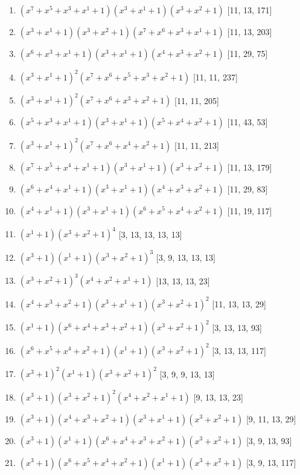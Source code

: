 \documentclass[10pt,twocolumn]{article}
\begin{document}
\begin{enumerate}
\item $(x^{7} + x^{5} + x^{3} + x^{1} + 1)(x^{3} + x^{1} + 1)(x^{3} + x^{2} + 1)$  [11, 13, 171]
\item $(x^{3} + x^{1} + 1)(x^{3} + x^{2} + 1)(x^{7} + x^{6} + x^{3} + x^{1} + 1)$  [11, 13, 203]
\item $(x^{6} + x^{3} + x^{1} + 1)(x^{3} + x^{1} + 1)(x^{4} + x^{3} + x^{2} + 1)$  [11, 29, 75]
\item $(x^{3} + x^{1} + 1)^{2}(x^{7} + x^{6} + x^{5} + x^{3} + x^{2} + 1)$  [11, 11, 237]
\item $(x^{3} + x^{1} + 1)^{2}(x^{7} + x^{6} + x^{3} + x^{2} + 1)$  [11, 11, 205]
\item $(x^{5} + x^{3} + x^{1} + 1)(x^{3} + x^{1} + 1)(x^{5} + x^{4} + x^{2} + 1)$  [11, 43, 53]
\item $(x^{3} + x^{1} + 1)^{2}(x^{7} + x^{6} + x^{4} + x^{2} + 1)$  [11, 11, 213]
\item $(x^{7} + x^{5} + x^{4} + x^{1} + 1)(x^{3} + x^{1} + 1)(x^{3} + x^{2} + 1)$  [11, 13, 179]
\item $(x^{6} + x^{4} + x^{1} + 1)(x^{3} + x^{1} + 1)(x^{4} + x^{3} + x^{2} + 1)$  [11, 29, 83]
\item $(x^{4} + x^{1} + 1)(x^{3} + x^{1} + 1)(x^{6} + x^{5} + x^{4} + x^{2} + 1)$  [11, 19, 117]
\item $(x^{1} + 1)(x^{3} + x^{2} + 1)^{4}$  [3, 13, 13, 13, 13]
\item $(x^{3} + 1)(x^{1} + 1)(x^{3} + x^{2} + 1)^{3}$  [3, 9, 13, 13, 13]
\item $(x^{3} + x^{2} + 1)^{3}(x^{4} + x^{2} + x^{1} + 1)$  [13, 13, 13, 23]
\item $(x^{4} + x^{3} + x^{2} + 1)(x^{3} + x^{1} + 1)(x^{3} + x^{2} + 1)^{2}$  [11, 13, 13, 29]
\item $(x^{1} + 1)(x^{6} + x^{4} + x^{3} + x^{2} + 1)(x^{3} + x^{2} + 1)^{2}$  [3, 13, 13, 93]
\item $(x^{6} + x^{5} + x^{4} + x^{2} + 1)(x^{1} + 1)(x^{3} + x^{2} + 1)^{2}$  [3, 13, 13, 117]
\item $(x^{3} + 1)^{2}(x^{1} + 1)(x^{3} + x^{2} + 1)^{2}$  [3, 9, 9, 13, 13]
\item $(x^{3} + 1)(x^{3} + x^{2} + 1)^{2}(x^{4} + x^{2} + x^{1} + 1)$  [9, 13, 13, 23]
\item $(x^{3} + 1)(x^{4} + x^{3} + x^{2} + 1)(x^{3} + x^{1} + 1)(x^{3} + x^{2} + 1)$  [9, 11, 13, 29]
\item $(x^{3} + 1)(x^{1} + 1)(x^{6} + x^{4} + x^{3} + x^{2} + 1)(x^{3} + x^{2} + 1)$  [3, 9, 13, 93]
\item $(x^{3} + 1)(x^{6} + x^{5} + x^{4} + x^{2} + 1)(x^{1} + 1)(x^{3} + x^{2} + 1)$  [3, 9, 13, 117]

\end{enumerate}
\end{document}

